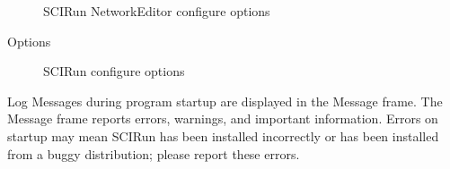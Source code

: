 \documentclass[fleqn,12pt,openany]{book}
\begin{document}
\begin{customdesc}
\begin{customdesc}
\begin{figure}[H]
\begin{centering}
\caption{SCIRun NetworkEditor configure options}
\end{centering}
\end{figure}
  \item[Options]
\begin{figure}[H]\label{misc_options}
\begin{centering}
\caption{SCIRun configure options}
\end{centering}
\end{figure}
  \item[Log]
Messages during program startup are displayed in the Message frame.
The Message frame reports errors, warnings, and important information.
Errors on startup may mean SCIRun has been installed incorrectly or has been installed from a buggy distribution; please report these errors.


\end{customdesc}
\end{customdesc}
\end{document}
